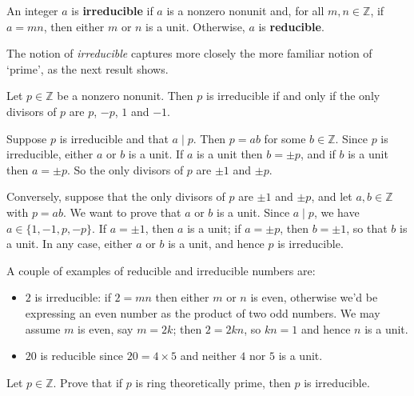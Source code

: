 \begin{definition}
\label{defReducible}
An integer $a$ is \textbf{irreducible} if $a$ is a nonzero nonunit and, for all $m,n \in \mathbb{Z}$, if $a=mn$, then either $m$ or $n$ is a unit. Otherwise, $a$ is \textbf{reducible}.
\end{definition}

The notion of \textit{irreducible} captures more closely the more familiar notion of `prime', as the next result shows.

\begin{proposition}
\label{propFactorsOfIrred}
Let $p \in \mathbb{Z}$ be a nonzero nonunit. Then $p$ is irreducible if and only if the only divisors of $p$ are $p$, $-p$, $1$ and $-1$.
\end{proposition}
\begin{cproof}
Suppose $p$ is irreducible and that $a \mid p$. Then $p = ab$ for some $b \in \mathbb{Z}$. Since $p$ is irreducible, either $a$ or $b$ is a unit. If $a$ is a unit then $b = \pm p$, and if $b$ is a unit then $a = \pm p$. So the only divisors of $p$ are $\pm 1$ and $\pm p$.

Conversely, suppose that the only divisors of $p$ are $\pm 1$ and $\pm p$, and let $a,b \in \mathbb{Z}$ with $p=ab$. We want to prove that $a$ or $b$ is a unit. Since $a \mid p$, we have $a \in \{ 1, -1, p, -p \}$. If $a = \pm 1$, then $a$ is a unit; if $a=\pm p$, then $b = \pm 1$, so that $b$ is a unit. In any case, either $a$ or $b$ is a unit, and hence $p$ is irreducible.
\end{cproof}

\begin{example}
A couple of examples of reducible and irreducible numbers are:
\begin{itemize}
\item $2$ is irreducible: if $2=mn$ then either $m$ or $n$ is even, otherwise we'd be expressing an even number as the product of two odd numbers. We may assume $m$ is even, say $m=2k$; then $2=2kn$, so $kn=1$ and hence $n$ is a unit.
\item $20$ is reducible since $20 = 4 \times 5$ and neither $4$ nor $5$ is a unit.
\end{itemize}
\end{example}

\begin{exercise}
Let $p \in \mathbb{Z}$. Prove that if $p$ is ring theoretically prime, then $p$ is irreducible.
\end{exercise}

